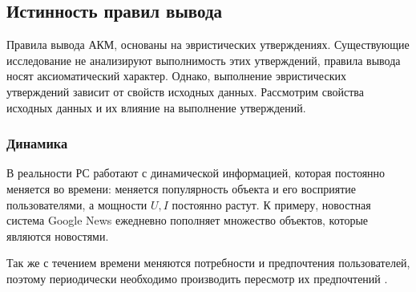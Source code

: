 \subsection{Истинность правил вывода}
Правила вывода АКМ, основаны на эвристических
утверждениях. Существующие исследование не анализируют выполнимость этих
утверждений, правила вывода носят аксиоматический характер. Однако,
выполнение эвристических утверждений зависит от свойств исходных данных.
Рассмотрим свойства исходных данных и их влияние на выполнение утверждений.
\subsubsection{Динамика}
В реальности РС работают с динамической информацией,
которая постоянно меняется во времени:
меняется популярность объекта и его восприятие пользователями,
а мощности $U, I$ постоянно растут.
К примеру, новостная система Google News \cite{google-news} ежедневно
пополняет множество объектов, которые являются новостями.

Так же с течением времени меняются потребности и предпочтения пользователей,
поэтому периодически необходимо производить пересмотр их предпочтений \cite{changes}.

